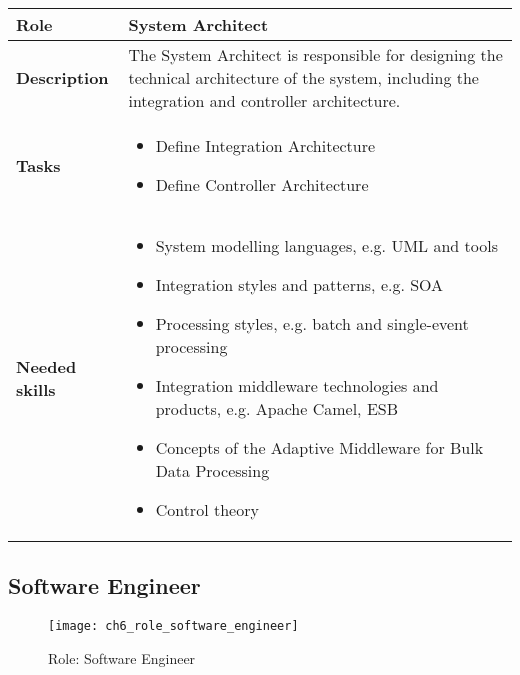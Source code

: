 \begin{tabularx}{\textwidth}{@{} l X @{}}
	\caption{System Architect}\label{table:ch6_Role_System_Architect}\\
	\toprule 
	\bfseries Role & System Architect\\
	\midrule
	\bfseries Description & The System Architect is responsible for designing the technical architecture of the system, including the integration and controller architecture.\\
	\midrule
	\bfseries Tasks & 
	\begin{itemize}
		\item Define Integration Architecture
		\item Define Controller Architecture
	\end{itemize}
	\\
	\midrule
	\bfseries Needed skills & 
	\begin{itemize}
		\item System modelling languages, e.g. \ac{UML} and tools
		\item Integration styles and patterns, e.g. \ac{SOA}
		\item Processing styles, e.g. batch and single-event processing
		\item Integration middleware technologies and products, e.g. Apache Camel, \ac{ESB}
		\item Concepts of the Adaptive Middleware for Bulk Data Processing
		\item Control theory
	\end{itemize}
	\\
	\bottomrule
\end{tabularx}


\subsection{Software Engineer}

\begin{figure}[htpb] \centering 
	\texttt{[image: ch6\_role\_software\_engineer]} 
	\caption{Role: Software Engineer} 
	\label{fig:ch6_role_software_engineer} 
\end{figure}

